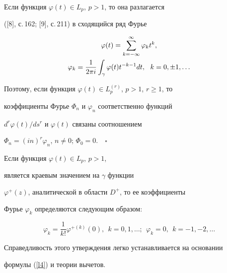 Если функция $\varphi(t) \in L_p$, $p>1$, то она разлагается


([8], с.\,162; [9], с.\,211) в сходящийся ряд Фурье


\begin{gather}


\varphi(t)=\sum_{k=-\infty}^\infty \varphi_k t^k,\notag \\


\label{l4} \varphi_k=\frac{1}{2\pi i}\int_\gamma


{\varphi(t)t^{-k-1}}dt,\ \ k=0,\pm 1,\dotsc


\end{gather}





Поэтому, если функция $\varphi (t) \in L_p^{(r)}$, $p>1$, $r \geqslant 1$, то


коэффициенты Фурье $\Phi_n$ и $\varphi_n$ соответственно функций


$d^r\varphi(t)/ds^r$ и $\varphi (t)$ связаны соотношением


$\Phi_n=(in)^r\varphi_n$, $n\neq0$; $\Phi_0=0$.$\quad\square$








\begin{lem}


Если функция $\varphi (t)\in L_p$, $p>1$, 


является краевым значением на $\gamma$ функции


$\varphi^+(z)$, аналитической в области $D^+$, то ее коэффициенты


Фурье $\varphi_k$ определяются следующим образом\/${:}$


$$


\varphi_k=\frac{1}{k!}\varphi^{+(k)}(0),


\ \ k=0,1,\dotsc;\ \ \varphi_k=0,\ \ k=-1,-2,\dotsc


$$


\end{lem}





Справедливость этого утверждения легко устанавливается на основании 


формулы (\ref{l4}) и теории вычетов.


\medskip








